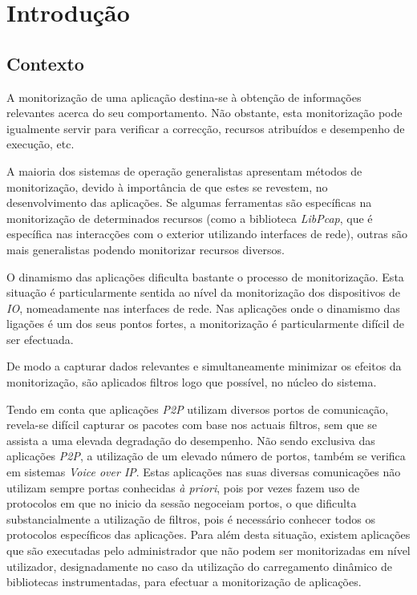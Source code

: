 \chapter{Introdução}\label{cap:introducao}

\section{Contexto}
\label{sec:intro_context}
A monitorização de uma aplicação destina-se à obtenção de informações relevantes acerca do seu comportamento.
Não obstante, esta monitorização pode igualmente servir para verificar a correcção, recursos atribuídos e desempenho de execução, etc.

A maioria dos sistemas de operação generalistas apresentam métodos de monitorização, devido à importância de que estes se revestem, no desenvolvimento das aplicações.
Se algumas ferramentas são específicas na monitorização de determinados recursos (como a biblioteca \textit{LibPcap}, que é específica nas interacções com o exterior utilizando interfaces de rede), outras são mais generalistas podendo monitorizar recursos diversos.

O dinamismo das aplicações dificulta bastante o processo de monitorização.
Esta situação é particularmente sentida ao nível da monitorização dos dispositivos de \textit{IO}, nomeadamente nas interfaces de rede.
Nas aplicações onde o dinamismo das ligações é um dos seus pontos fortes, a monitorização é particularmente difícil de ser efectuada.

De modo a capturar dados relevantes e simultaneamente minimizar os efeitos da monitorização, são aplicados filtros logo que possível, no núcleo do sistema.

Tendo em conta que aplicações \textit{P2P} utilizam diversos portos de comunicação, revela-se difícil capturar os pacotes com base nos actuais filtros, sem que se assista a uma elevada degradação do desempenho.
Não sendo exclusiva das aplicações \textit{P2P}, a utilização de um elevado número de portos, também se verifica em sistemas \textit{Voice over IP}.
Estas aplicações nas suas diversas comunicações não utilizam sempre portas conhecidas \textit{à priori}, pois por vezes fazem uso de protocolos em que no inicio da sessão negoceiam portos, o que dificulta substancialmente a utilização de filtros, pois é necessário conhecer todos os protocolos específicos das aplicações.
Para além desta situação, existem aplicações que são executadas pelo administrador que não podem ser monitorizadas em nível utilizador, designadamente no caso da utilização do carregamento dinâmico de bibliotecas instrumentadas, para efectuar a monitorização de aplicações.

